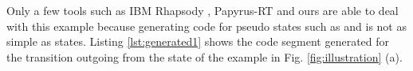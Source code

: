 Only a few tools such as IBM Rhapsody \cite{ibm_rhapsody}, Papyrus-RT \cite{possepapyrusrt} and ours are able to deal with this example because generating code for pseudo states such as  and  is not as simple as states.
Listing \ref{lst:generated1} shows the code segment generated for the transition outgoing from the state  of the example in Fig. \ref{fig:illustration} (a). 

\begin{minipage}{0.95\columnwidth}

\end{minipage}






